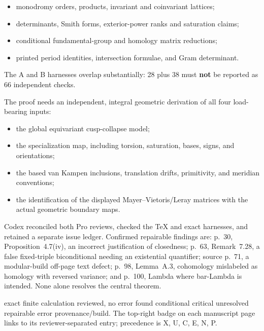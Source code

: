 {\noindent\begin{minipage}[t]{0.405\textwidth}
\vspace{0pt}
\GuideTightList
\begin{itemize}
\item monodromy orders, products, invariant and coinvariant lattices;
\item determinants, Smith forms, exterior-power ranks and saturation claims;
\item conditional fundamental-group and homology matrix reductions;
\item printed period identities, intersection formulae, and Gram determinant.
\end{itemize}
The A and B harnesses overlap substantially: 28 plus 38 must \textbf{not} be reported as 66 independent checks.
\end{minipage}\hfill
\begin{minipage}[t]{0.565\textwidth}
\vspace{0pt}
The proof needs an independent, integral geometric derivation of all four load-bearing inputs:
\GuideTightList
\begin{itemize}
\item the global equivariant cusp-collapse model;
\item the specialization map, including torsion, saturation, bases, signs, and orientations;
\item the based van Kampen inclusions, translation drifts, primitivity, and meridian conventions;
\item the identification of the displayed Mayer--Vietoris/Leray matrices with the actual geometric boundary maps.
\end{itemize}
\end{minipage}

Codex reconciled both Pro reviews, checked the TeX and exact harnesses, and retained a separate issue ledger. Confirmed repairable findings are: p.~30, Proposition~4.7(iv), an incorrect justification of closedness; p.~63, Remark~7.28, a false fixed-triple biconditional needing an existential quantifier; source p.~71, a modular-build off-page text defect; p.~98, Lemma~A.3, cohomology mislabeled as homology with reversed variance; and p.~100, Lambda where bar-Lambda is intended. None alone resolves the central theorem.

 exact finite calculation\quad
{} reviewed, no error found\quad
{} conditional\quad
{} critical unresolved\quad
{} repairable error\quad
{} provenance/build.
The top-right badge on each manuscript page links to its reviewer-separated entry; precedence is X, U, C, E, N, P.

}
